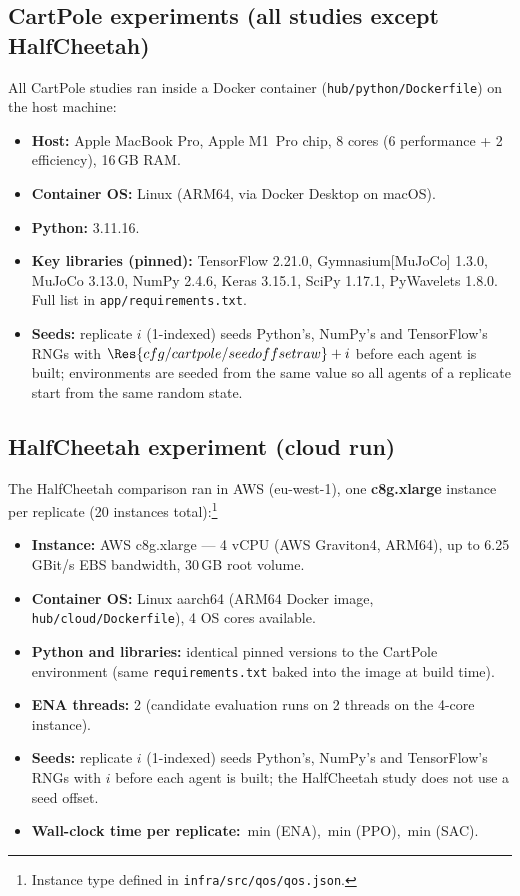 \subsection*{CartPole experiments (all studies except HalfCheetah)}
All CartPole studies ran inside a Docker container (\texttt{hub/python/Dockerfile}) on the host machine:
\begin{itemize}
  \item \textbf{Host:} Apple MacBook Pro, Apple M1~Pro chip, 8 cores (6 performance + 2 efficiency), 16\,GB RAM.
  \item \textbf{Container OS:} Linux (ARM64, via Docker Desktop on macOS).
  \item \textbf{Python:} 3.11.16.
  \item \textbf{Key libraries (pinned):} TensorFlow 2.21.0, Gymnasium[MuJoCo] 1.3.0, MuJoCo 3.13.0, NumPy 2.4.6, Keras 3.15.1, SciPy 1.17.1, PyWavelets 1.8.0. Full list in \texttt{app/requirements.txt}.
  \item \textbf{Seeds:} replicate $i$ (1-indexed) seeds Python's, NumPy's and TensorFlow's RNGs with $\Res{cfg/cartpole/seedoffsetraw} + i$ before each agent is built; environments are seeded from the same value so all agents of a replicate start from the same random state.
\end{itemize}

\subsection*{HalfCheetah experiment (cloud run)}
The HalfCheetah comparison ran in AWS (eu-west-1), one \textbf{c8g.xlarge} instance per replicate (20 instances total):\footnote{Instance type defined in \texttt{infra/src/qos/qos.json}.}
\begin{itemize}
  \item \textbf{Instance:} AWS c8g.xlarge --- 4 vCPU (AWS Graviton4, ARM64), up to 6.25\,GBit/s EBS bandwidth, 30\,GB root volume.
  \item \textbf{Container OS:} Linux aarch64 (ARM64 Docker image, \texttt{hub/cloud/Dockerfile}), 4 OS cores available.
  \item \textbf{Python and libraries:} identical pinned versions to the CartPole environment (same \texttt{requirements.txt} baked into the image at build time).
  \item \textbf{ENA threads:} 2 (candidate evaluation runs on 2 threads on the 4-core instance).
  \item \textbf{Seeds:} replicate $i$ (1-indexed) seeds Python's, NumPy's and TensorFlow's RNGs with $i$ before each agent is built; the HalfCheetah study does not use a seed offset.
  \item \textbf{Wall-clock time per replicate:} \,min (ENA), \,min (PPO), \,min (SAC).
\end{itemize}


